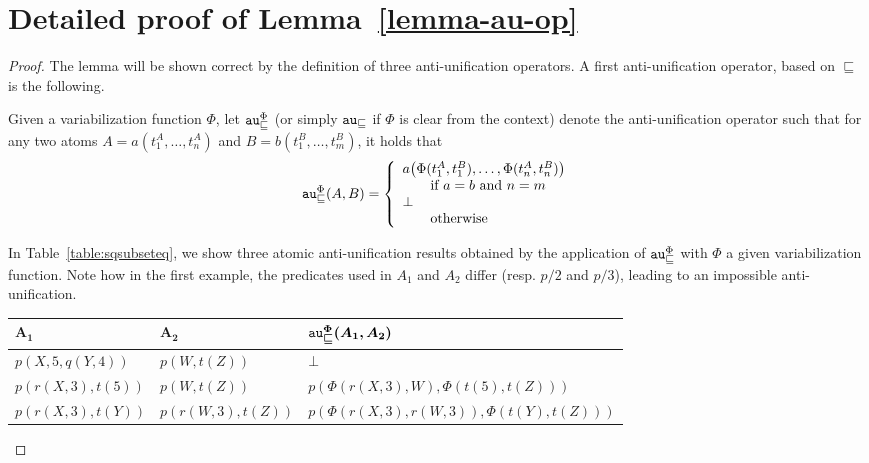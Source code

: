 	\section{Detailed proof of Lemma~\ref{lemma-au-op}}
	\begin{proof}
The lemma will be shown correct by the definition of three anti-unification operators. A first anti-unification operator, based on $\sqsubseteq$ is the following. 

\begin{definition}%
	\label{def-atoms-au}
	Given a variabilization function $\Phi$, let $\texttt{au}^\Phi_\sqsubseteq$ (or simply $\texttt{au}_\sqsubseteq$ if $\Phi$ is clear from the context) denote the anti-unification operator such that for any two atoms $A = a(t^A_1, \dots, t^A_n)$ and $B = b(t^B_1, \dots, t^B_m)$, it holds that \[\texttt{au}^{\Phi}_\sqsubseteq(A,B)=\left\{\begin{array}{l}
		a\big(\Phi(t^A_1, t^B_1), \dots, \Phi(t^A_n, t^B_n)\big) \\ \qquad  \mbox{if } a = b \mbox{ and } n = m\\
		\bot \\
		\qquad \mbox{otherwise}\\
	\end{array}\right. \]
\end{definition} 

\begin{example}\label{ex-au-sq}
	In Table~\ref{table:sqsubseteq}, we show three atomic anti-unification results obtained by the application of $\texttt{au}_\sqsubseteq^\Phi$ with $\Phi$ a given variabilization function. Note how in the first example, the predicates used in $A_1$ and $A_2$ differ (resp. $p/2$ and $p/3$), leading to an impossible anti-unification.
\end{example}

\begin{table*}
	\caption{Example results for $au_\sqsubseteq^\Phi$}
	\label{table:sqsubseteq}
	\centering
	\begin{tabular}{l|l|l}
		$\bm{A_1}$ & $\bm{A_2}$ & $\bm{\texttt{au}_\sqsubseteq^\Phi(A_1, A_2)}$\\\hline 
		$p(X, 5, q(Y,4))$ & $p(W,t(Z))$ & $\bot$\\\hline 
		$p(r(X,3), t(5))$ & $p(W, t(Z))$ & $p(\Phi(r(X,3),W), \Phi(t(5), t(Z)))$\\\hline 
		$p(r(X,3), t(Y))$ & $p(r(W,3),t(Z))$ & $p(\Phi(r(X,3),r(W,3)), \Phi(t(Y),t(Z)))$ %
	\end{tabular} 
\end{table*}


\end{proof}

